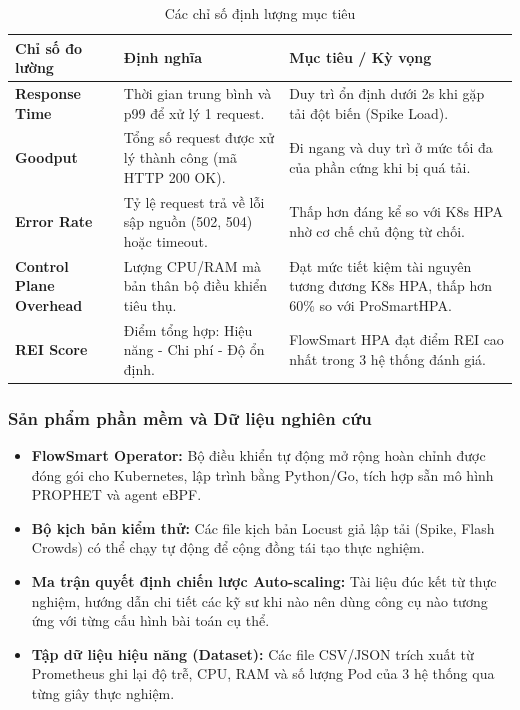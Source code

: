 \documentclass[14pt]{article}
\begin{document}
\begin{table}[H]
\centering
\caption{Các chỉ số định lượng mục tiêu}
\renewcommand{\arraystretch}{1.3}
\begin{tabular}{|>{\raggedright\arraybackslash}p{4.5cm}|>{\raggedright\arraybackslash}p{5cm}|>{\raggedright\arraybackslash}p{5cm}|}
\hline
\textbf{Chỉ số đo lường} & \textbf{Định nghĩa} & \textbf{Mục tiêu / Kỳ vọng} \\ \hline
\textbf{Response Time} & Thời gian trung bình và p99 để xử lý 1 request. & Duy trì ổn định dưới 2s khi gặp tải đột biến (Spike Load). \\ \hline
\textbf{Goodput} & Tổng số request được xử lý thành công (mã HTTP 200 OK). & Đi ngang và duy trì ở mức tối đa của phần cứng khi bị quá tải. \\ \hline
\textbf{Error Rate} & Tỷ lệ request trả về lỗi sập nguồn (502, 504) hoặc timeout. & Thấp hơn đáng kể so với K8s HPA nhờ cơ chế chủ động từ chối. \\ \hline
\textbf{Control Plane Overhead} & Lượng CPU/RAM mà bản thân bộ điều khiển tiêu thụ. & Đạt mức tiết kiệm tài nguyên tương đương K8s HPA, thấp hơn 60\% so với ProSmartHPA. \\ \hline
\textbf{REI Score} & Điểm tổng hợp: Hiệu năng - Chi phí - Độ ổn định. & FlowSmart HPA đạt điểm REI cao nhất trong 3 hệ thống đánh giá. \\ \hline
\end{tabular}
\end{table}

\subsubsection{Sản phẩm phần mềm và Dữ liệu nghiên cứu}

\begin{itemize}[leftmargin=1.5cm, label=\textbullet]
    \item \textbf{FlowSmart Operator:} Bộ điều khiển tự động mở rộng hoàn chỉnh được đóng gói cho Kubernetes, lập trình bằng Python/Go, tích hợp sẵn mô hình PROPHET và agent eBPF.
    \item \textbf{Bộ kịch bản kiểm thử:} Các file kịch bản Locust giả lập tải (Spike, Flash Crowds) có thể chạy tự động để cộng đồng tái tạo thực nghiệm.
    \item \textbf{Ma trận quyết định chiến lược Auto-scaling:} Tài liệu đúc kết từ thực nghiệm, hướng dẫn chi tiết các kỹ sư khi nào nên dùng công cụ nào tương ứng với từng cấu hình bài toán cụ thể.
    \item \textbf{Tập dữ liệu hiệu năng (Dataset):} Các file CSV/JSON trích xuất từ Prometheus ghi lại độ trễ, CPU, RAM và số lượng Pod của 3 hệ thống qua từng giây thực nghiệm.
\end{itemize}
\end{document}
